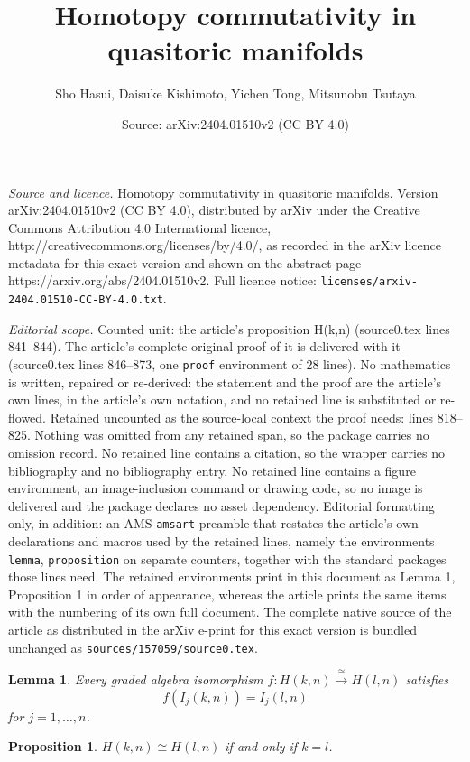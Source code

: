 \documentclass[10pt,a4paper]{amsart}
\title{Homotopy commutativity in quasitoric manifolds}
\author{Sho Hasui, Daisuke Kishimoto, Yichen Tong, Mitsunobu Tsutaya}
\date{Source: arXiv:2404.01510v2 (CC BY 4.0)}
\newtheorem{lemma}{Lemma}
\newtheorem{proposition}{Proposition}
\begin{document}
\maketitle

\noindent\emph{Source and licence.} Homotopy commutativity in quasitoric manifolds. Version arXiv:2404.01510v2 (CC BY 4.0), distributed by arXiv under the Creative Commons Attribution 4.0 International licence, http://creativecommons.org/licenses/by/4.0/, as recorded in the arXiv licence metadata for this exact version and shown on the abstract page https://arxiv.org/abs/2404.01510v2. Full licence notice: \texttt{licenses/arxiv-2404.01510-CC-BY-4.0.txt}.\par\smallskip

\noindent\textit{Editorial scope.} Counted unit: the article's proposition H(k,n) (source0.tex lines 841--844). The article's complete original proof of it is delivered with it (source0.tex lines 846--873, one \texttt{proof} environment of 28 lines). No mathematics is written, repaired or re-derived: the statement and the proof are the article's own lines, in the article's own notation, and no retained line is substituted or re-flowed.  Retained uncounted as the source-local context the proof needs: lines 818--825.  Nothing was omitted from any retained span, so the package carries no omission record.  No retained line contains a citation, so the wrapper carries no bibliography and no bibliography entry.  No retained line contains a figure environment, an image-inclusion command or drawing code, so no image is delivered and the package declares no asset dependency.  Editorial formatting only, in addition: an AMS \texttt{amsart} preamble that restates the article's own declarations and macros used by the retained lines, namely the environments \texttt{lemma}, \texttt{proposition} on separate counters, together with the standard packages those lines need.  The retained environments print in this document as Lemma 1, Proposition 1 in order of appearance, whereas the article prints the same items with the numbering of its own full document.  The complete native source of the article as distributed in the arXiv e-print for this exact version is bundled unchanged as \texttt{sources/157059/source0.tex}.
\begin{lemma}
  \label{I(k,n)}
  Every graded algebra isomorphism $f\colon H(k,n)\xrightarrow{\cong}H(l,n)$ satisfies
  \[
    f(I_j(k,n))=I_j(l,n)
  \]
  for $j=1,\ldots,n$.
\end{lemma}

\begin{proposition}
  \label{H(k,n)}
  $H(k,n)\cong H(l,n)$ if and only if $k=l$.
\end{proposition}
\end{document}
